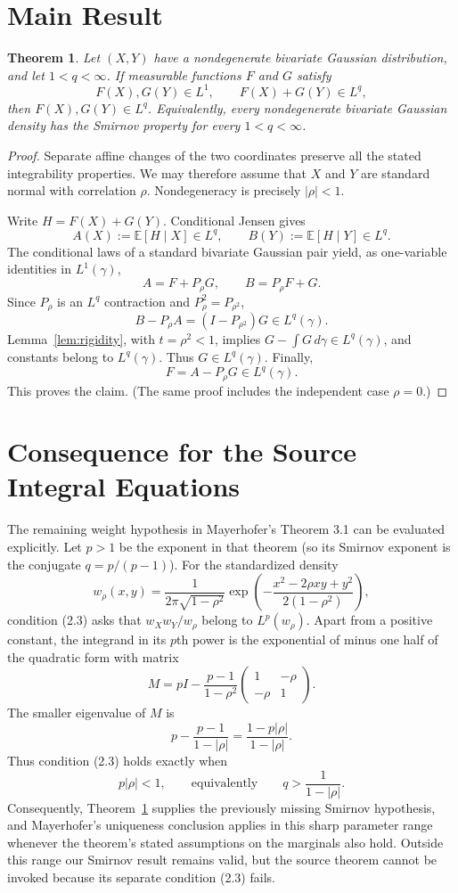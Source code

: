\documentclass[11pt]{article}
\newtheorem{theorem}{Theorem}
\newcommand{\E}{\mathbb E}
\newcommand{\ga}{\gamma}
\begin{document}
\section*{Main Result}

\begin{theorem}\label{thm:main}
Let $(X,Y)$ have a nondegenerate bivariate Gaussian distribution, and let
$1<q<\infty$.  If measurable functions $F$ and $G$ satisfy
\[
 F(X),G(Y)\in L^1,\qquad F(X)+G(Y)\in L^q,
\]
then $F(X),G(Y)\in L^q$.  Equivalently, every nondegenerate bivariate Gaussian
density has the Smirnov property for every $1<q<\infty$.
\end{theorem}

\begin{proof}
Separate affine changes of the two coordinates preserve all the stated
integrability properties.  We may therefore assume that $X$ and $Y$ are
standard normal with correlation $\rho$.  Nondegeneracy is precisely
$|\rho|<1$.

Write $H=F(X)+G(Y)$.  Conditional Jensen gives
\[
 A(X):=\E[H\mid X]\in L^q,
 \qquad
 B(Y):=\E[H\mid Y]\in L^q.
\]
The conditional laws of a standard bivariate Gaussian pair yield, as
one-variable identities in $L^1(\ga)$,
\[
 A=F+P_\rho G,\qquad B=P_\rho F+G.
\]
Since $P_\rho$ is an $L^q$ contraction and
$P_\rho^2=P_{\rho^2}$,
\[
 B-P_\rho A=(I-P_{\rho^2})G\in L^q(\ga).
\]
Lemma~\ref{lem:rigidity}, with $t=\rho^2<1$, implies
$G-\int G\,d\ga\in L^q(\ga)$, and constants belong to $L^q(\ga)$.
Thus $G\in L^q(\ga)$.  Finally,
\[
 F=A-P_\rho G\in L^q(\ga).
\]
This proves the claim.  (The same proof includes the independent case
$\rho=0$.)
\end{proof}

\section*{Consequence for the Source Integral Equations}

The remaining weight hypothesis in Mayerhofer's Theorem 3.1 can be evaluated
explicitly.  Let $p>1$ be the exponent in that theorem (so its Smirnov
exponent is the conjugate $q=p/(p-1)$).  For the standardized density
\[
 w_\rho(x,y)=\frac{1}{2\pi\sqrt{1-\rho^2}}
 \exp\!\left(-\frac{x^2-2\rho xy+y^2}{2(1-\rho^2)}\right),
\]
condition (2.3) asks that $w_Xw_Y/w_\rho$ belong to $L^p(w_\rho)$.  Apart
from a positive constant, the integrand in its $p$th power is the exponential
of minus one half of the quadratic form with matrix
\[
 M=pI-\frac{p-1}{1-\rho^2}
 \begin{pmatrix}1&-\rho\\-\rho&1\end{pmatrix}.
\]
The smaller eigenvalue of $M$ is
\[
 p-\frac{p-1}{1-|\rho|}
   =\frac{1-p|\rho|}{1-|\rho|}.
\]
Thus condition (2.3) holds exactly when
\[
 p|\rho|<1,
 \qquad\text{equivalently}\qquad
 q>\frac{1}{1-|\rho|}.
\]
Consequently, Theorem~\ref{thm:main} supplies the previously missing Smirnov
hypothesis, and Mayerhofer's uniqueness conclusion applies in this sharp
parameter range whenever the theorem's stated assumptions on the marginals
also hold.  Outside this range our Smirnov result remains valid, but the
source theorem cannot be invoked because its separate condition (2.3) fails.
\end{document}

